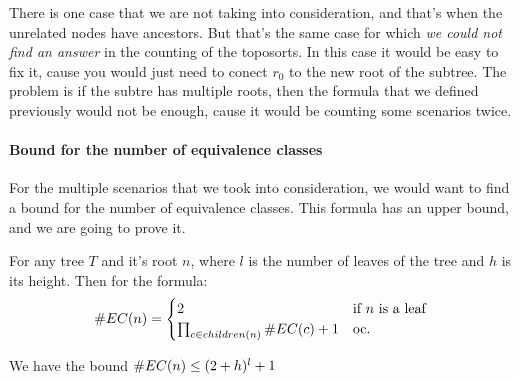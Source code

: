 There is one case that we are not taking into consideration, and that's when the unrelated nodes have ancestors. But that's the same case for which \emph{we could not find an answer} in the counting of the toposorts. In this case it would be easy to fix it, cause you would just need to conect $r_0$ to the new root of the subtree. The problem is if the subtre has multiple roots, then the formula that we defined previously would not be enough, cause it would be counting some scenarios twice. 

\paragraph{Bound for the number of equivalence classes}

For the multiple scenarios that we took into consideration, we would want to find a bound for the number of equivalence classes. This formula has an upper bound, and we are going to prove it. 

\begin{lemma}\label{lemma:upper_bound_equivalence_classes}
    For any tree $T$ and it's root $n$, where $l$ is the number of leaves of the tree and $h$ is its height. Then for the formula: 
    \[
    \#EC(n) = 
    \begin{cases} 
    2 & \text{if $n$ is a leaf} \\
    \prod_{c \in children(n)} \#EC(c) + 1 & \text{oc.}
    \end{cases}
    \]

    We have the bound $\#EC(n) \leq (2+h)^l + 1$
      
\end{lemma}

